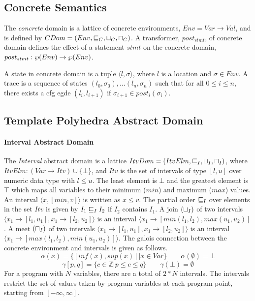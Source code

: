 
\subsection{Concrete Semantics}
The {\em concrete} domain is a lattice 
of concrete environments, $Env = Var \rightarrow Val$, and is 
defined by $CDom = (Env, \sqsubseteq_{C}, \sqcup_{C}, \sqcap_{C})$.
A transformer, $post_{stmt}$, of concrete domain defines 
the effect of a statement $stmt$ on the concrete domain, 
$post_{stmt} : \wp(Env) \rightarrow \wp(Env)$.  

A state in concrete domain is a tuple $\langle l, \sigma \rangle$, 
where $l$ is a location and $\sigma \in Env$.  A trace is a sequence 
of states $(l_0, \sigma_0), \ldots (l_n, \sigma_n)$ such that for all 
$0 \leq i \leq n$, there exists a cfg egde $(l_{i}, l_{i+1})$ 
if $\sigma_{i+1} \in post_{i}(\sigma_{i})$. 

\subsection{Template Polyhedra Abstract Domain}


\paragraph{Interval Abstract Domain} 
The {\em Interval} abstract domain is a lattice 
$ItvDom = (ItvElm, \sqsubseteq_{I}, \sqcup_{I}, \sqcap_{I})$, where
$ItvElm: (Var \rightarrow Itv) \cup \{\bot\}$, and $Itv$ is 
the set of intervals of type $[l,u]$ over numeric data 
type with $l \leq u$. The least element is $\bot$ and the 
greatest element is $\top$ which maps all variables to their
minimum ($min$) and maximum ($max$) values.  An interval 
$\langle x, [min, v] \rangle$ is written as $x \leq v$.  The 
partial order $\sqsubseteq_{I}$ over elements in the set $Itv$ is 
given by $I_1 \sqsubseteq_{I} I_2$ if $I_2$ contains $I_1$.
A join $(\sqcup_{I})$ of two intervals $\langle x_1 \rightarrow [l_1, u_1], 
x_1 \rightarrow [l_2, u_2] \rangle$ is an interval 
$\langle x_1 \rightarrow [min(l_1, l_2), max(u_1, u_2)]$.
A meet $(\sqcap_{I})$ of two intervals $\langle x_1 \rightarrow [l_1, u_1], 
x_1 \rightarrow [l_2, u_2] \rangle$ is an interval 
$\langle x_1 \rightarrow [max(l_1, l_2), min(u_1, u_2)] \rangle$.
The galois connection between the concrete environment and intervals is 
given as follows.
\[\alpha(x) = \{[inf(x), sup(x)] | x \in Var\} \qquad   \alpha(\emptyset) = \bot \]
\[\gamma[p,q] = \{c \in \mathbb{Z} | p \leq c \leq q\} \qquad \gamma(\bot) = \emptyset \]
For a program with $N$ variables, there are a total of 
$2*N$ intervals. The intervals restrict the set of values 
taken by program variables at each program point, starting 
from $[-\infty, \infty]$.   

